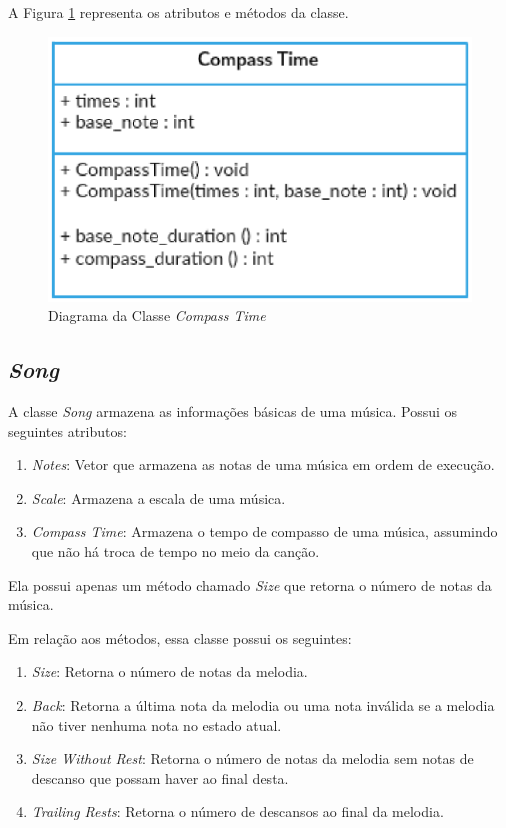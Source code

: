       A Figura \ref{compasstimeclass} representa os atributos e métodos da classe.

      \begin{figure}[htb]
        \centering
        \includegraphics[scale=0.7]{figuras/compasstimeclass.eps}
        \caption{Diagrama da Classe \textit{Compass Time}}
        \label{compasstimeclass}
      \end{figure}

    \subsection[\textit{Song}]{\textit{Song}}

      A classe \textit{Song} armazena as informações básicas de uma música. Possui os seguintes atributos:

      \begin{enumerate}
        \item \textit{Notes}: Vetor que armazena as notas de uma música em ordem de execução.
        \item \textit{Scale}: Armazena a escala de uma música.
        \item \textit{Compass Time}: Armazena o tempo de compasso de uma música, assumindo que não há troca de tempo no meio da canção.
      \end{enumerate}

      Ela possui apenas um método chamado \textit{Size} que retorna o número de notas da música.

      Em relação aos métodos, essa classe possui os seguintes:

      \begin{enumerate}
        \item \textit{Size}: Retorna o número de notas da melodia.
        \item \textit{Back}: Retorna a última nota da melodia ou uma nota inválida se a melodia não tiver nenhuma nota no estado atual.
        \item \textit{Size Without Rest}: Retorna o número de notas da melodia sem notas de descanso que possam haver ao final desta.
        \item \textit{Trailing Rests}: Retorna o número de descansos ao final da melodia.

      \end{enumerate}


